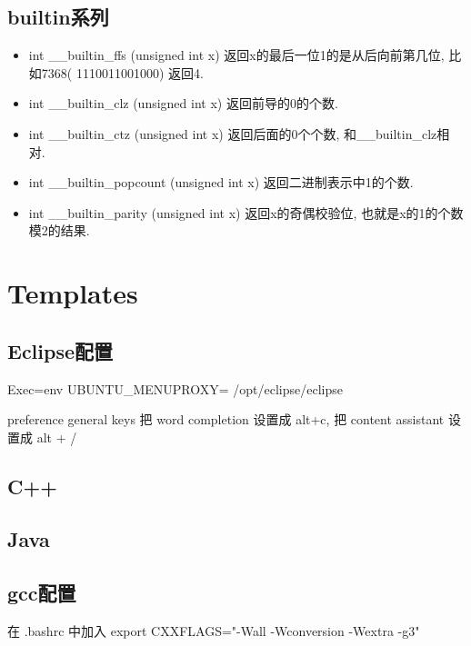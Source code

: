\documentclass[landscape, twocolumn, 8pt, a4paper, twoside]{extarticle}
\begin{document}
\begin{spacing}{0.1}
\subsection{builtin系列}
\begin{itemize}
\item int \_\_builtin\_ffs (unsigned int x) 返回x的最后一位1的是从后向前第几位,  比如7368( 1110011001000) 返回4. 
\item int \_\_builtin\_clz (unsigned int x) 返回前导的0的个数. 
\item int \_\_builtin\_ctz (unsigned int x) 返回后面的0个个数, 和\_\_builtin\_clz相对. 
\item int \_\_builtin\_popcount (unsigned int x) 返回二进制表示中1的个数. 
\item int \_\_builtin\_parity (unsigned int x) 返回x的奇偶校验位, 也就是x的1的个数模2的结果. 
\end{itemize}

\section{Templates}

\subsection{Eclipse配置}
Exec=env UBUNTU\_MENUPROXY= /opt/eclipse/eclipse

preference general keys 把 word completion 设置成 alt+c, 把 content assistant 设置成 alt + /

\subsection{C++}


\subsection{Java}


\subsection{gcc配置}
在 .bashrc 中加入 export CXXFLAGS="-Wall -Wconversion -Wextra -g3"
\end{spacing}
\end{document}
